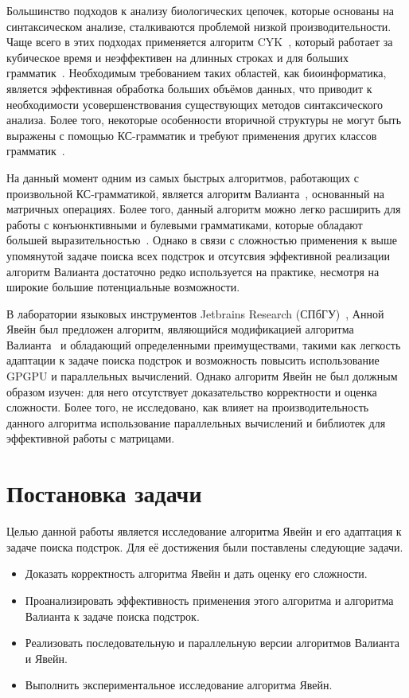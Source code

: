 Большинство подходов к анализу биологических цепочек, которые основаны на синтаксическом анализе, сталкиваются проблемой низкой производительности.
Чаще всего в этих подходах применяется алгоритм CYK~\cite{kasami1966efficient, Younger:1966:CLP:1441427.1442019}, который работает за кубическое время и неэффективен на длинных строках и для больших грамматик~\cite{liu2005parallel}.
Необходимым требованием таких областей, как биоинформатика, является эффективная обработка больших объёмов данных, что приводит к необходимости усовершенствования существующих методов синтаксического анализа.
Более того, некоторые особенности вторичной структуры не могут быть выражены с помощью КС-грамматик и требуют применения других классов грамматик~\cite{zier2013rna}.

На данный момент одним из самых быстрых алгоритмов, работающих с произвольной КС-грамматикой, является алгоритм Валианта~\cite{Valiant:1975:GCR:1739932.1740048}, основанный на матричных операциях.
Более того, данный алгоритм можно легко расширить для работы с конъюнктивными и булевыми грамматиками, которые обладают большей выразительностью~\cite{Okhotin:2014:PMM:2565359.2565379}.
Однако в связи с сложностью  применения к выше упомянутой задаче поиска всех подстрок и отсутсвия эффективной реализации алгоритм Валианта достаточно редко используется на практике, несмотря на широкие большие потенциальные возможности.

В лаборатории языковых инструментов Jetbrains Research (СПбГУ)~\cite{jetbrains}, Анной Явейн был предложен алгоритм, являющийся модификацией алгоритма Валианта~\cite{alg} и обладающий определенными преимуществами, такими как легкость адаптации к задаче поиска подстрок и возможность повысить использование GPGPU и параллельных вычислений.
Однако алгоритм Явейн не был должным образом изучен: для него отсутствует доказательство корректности и оценка сложности.
Более того, не исследовано, как влияет на производительность данного алгоритма использование параллельных вычислений и библиотек для эффективной работы с матрицами.



\section{Постановка задачи}

Целью данной работы является исследование алгоритма Явейн и его адаптация к задаче поиска подстрок.
Для её достижения были поставлены следующие задачи.

\begin{itemize}
	\item Доказать корректность алгоритма Явейн и дать оценку его сложности.
	\item Проанализировать эффективность применения этого алгоритма и алгоритма Валианта к задаче поиска подстрок.
	\item Реализовать последовательную и параллельную версии алгоритмов Валианта и Явейн.
	\item Выполнить экспериментальное исследование алгоритма Явейн.
\end{itemize}


